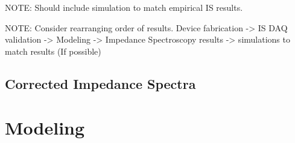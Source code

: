 \par NOTE: Should include simulation to match empirical IS results.

\par NOTE: Consider rearranging order of results. Device fabrication -> IS DAQ validation -> Modeling -> Impedance Spectroscopy results -> simulations to match results (If possible)




\FloatBarrier

\subsection{Corrected Impedance Spectra}

\FloatBarrier

\section{Modeling}

